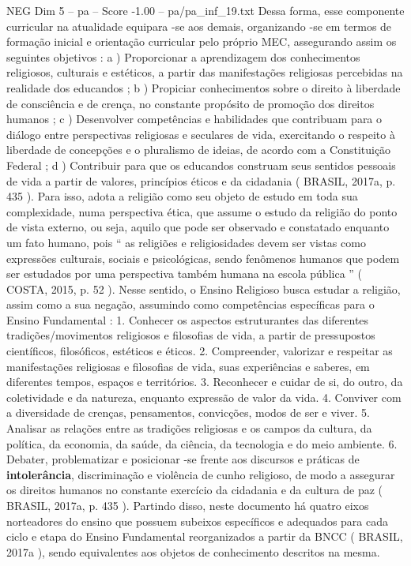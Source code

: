 \begin{textsample}{NEG Dim 5 – pa – Score -1.00 – pa/pa\_inf\_19.txt}
Dessa forma, esse componente curricular na atualidade equipara -se aos demais, organizando -se em termos de formação inicial e orientação curricular pelo próprio MEC, assegurando assim os seguintes objetivos : a ) Proporcionar a aprendizagem dos conhecimentos religiosos, culturais e estéticos, a partir das manifestações religiosas percebidas na realidade dos educandos ; b ) Propiciar conhecimentos sobre o direito à liberdade de consciência e de crença, no constante propósito de promoção dos direitos humanos ; c ) Desenvolver competências e habilidades que contribuam para o diálogo entre perspectivas religiosas e seculares de vida, exercitando o respeito à liberdade de concepções e o pluralismo de ideias, de acordo com a Constituição Federal ; d ) Contribuir para que os educandos construam seus sentidos pessoais de vida a partir de valores, princípios éticos e da cidadania ( BRASIL, 2017a, p. 435 ).
Para isso, adota a religião como seu objeto de estudo em toda sua complexidade, numa perspectiva ética, que assume o estudo da religião do ponto de vista externo, ou seja, aquilo que pode ser observado e constatado enquanto um fato humano, pois “ as religiões e religiosidades devem ser vistas como expressões culturais, sociais e psicológicas, sendo fenômenos humanos que podem ser estudados por uma perspectiva também humana na escola pública ” ( COSTA, 2015, p. 52 ).
Nesse sentido, o Ensino Religioso busca estudar a religião, assim como a sua negação, assumindo como competências específicas para o Ensino Fundamental : 1.
Conhecer os aspectos estruturantes das diferentes tradições/movimentos religiosos e filosofias de vida, a partir de pressupostos científicos, filosóficos, estéticos e éticos. 2.
Compreender, valorizar e respeitar as manifestações religiosas e filosofias de vida, suas experiências e saberes, em diferentes tempos, espaços e territórios. 3.
Reconhecer e cuidar de si, do outro, da coletividade e da natureza, enquanto expressão de valor da vida. 4.
Conviver com a diversidade de crenças, pensamentos, convicções, modos de ser e viver. 5.
Analisar as relações entre as tradições religiosas e os campos da cultura, da política, da economia, da saúde, da ciência, da tecnologia e do meio ambiente. 6.
Debater, problematizar e posicionar -se frente aos discursos e práticas de \textbf{intolerância}, discriminação e violência de cunho religioso, de modo a assegurar os direitos humanos no constante exercício da cidadania e da cultura de paz ( BRASIL, 2017a, p. 435 ).
Partindo disso, neste documento há quatro eixos norteadores do ensino que possuem subeixos específicos e adequados para cada ciclo e etapa do Ensino Fundamental reorganizados a partir da BNCC ( BRASIL, 2017a ), sendo equivalentes aos objetos de conhecimento descritos na mesma.

\end{textsample}

